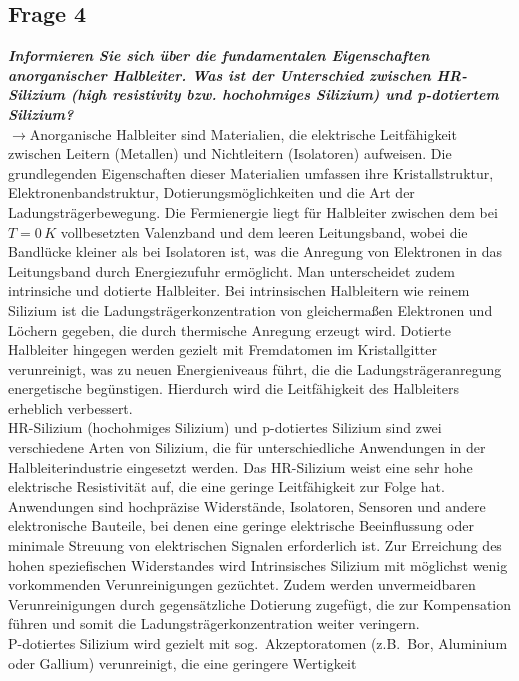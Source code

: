 \subsection{\label{subsec:FZV4}Frage 4}
\textbf{\textit{Informieren Sie sich über die fundamentalen Eigenschaften anorganischer Halbleiter.
Was ist der Unterschied zwischen HR-Silizium (high resistivity bzw. hochohmiges
Silizium) und p-dotiertem Silizium?}}\\
$\rightarrow$Anorganische Halbleiter sind Materialien, die elektrische Leitfähigkeit zwischen Leitern 
(Metallen) und Nichtleitern (Isolatoren) aufweisen. 
Die grundlegenden Eigenschaften dieser Materialien umfassen ihre Kristallstruktur, 
Elektronenbandstruktur, Dotierungsmöglichkeiten und die Art der Ladungsträgerbewegung.
Die Fermienergie liegt für Halbleiter zwischen dem bei $T=0\,\si{K}$ vollbesetzten 
Valenzband und dem leeren Leitungsband, wobei die Bandlücke kleiner als bei Isolatoren ist, 
was die Anregung von Elektronen in das Leitungsband durch Energiezufuhr ermöglicht. 
Man unterscheidet zudem intrinsiche und dotierte Halbleiter. 
Bei intrinsischen Halbleitern wie reinem Silizium ist die Ladungsträgerkonzentration von 
gleichermaßen Elektronen und Löchern gegeben, die durch thermische Anregung erzeugt wird. 
Dotierte Halbleiter hingegen werden gezielt mit Fremdatomen im Kristallgitter verunreinigt, 
was zu neuen Energieniveaus führt, die die Ladungsträgeranregung energetische begünstigen. 
Hierdurch wird die Leitfähigkeit des Halbleiters erheblich verbessert. \\
HR-Silizium (hochohmiges Silizium) und p-dotiertes Silizium sind zwei verschiedene Arten von Silizium, 
die für unterschiedliche Anwendungen in der Halbleiterindustrie eingesetzt werden.
Das HR-Silizium weist eine sehr hohe elektrische Resistivität auf, die eine geringe Leitfähigkeit 
zur Folge hat. Anwendungen sind hochpräzise Widerstände, 
Isolatoren, Sensoren und andere elektronische Bauteile, bei denen eine geringe 
elektrische Beeinflussung oder minimale Streuung von elektrischen Signalen erforderlich ist.
Zur Erreichung des hohen speziefischen Widerstandes wird Intrinsisches Silizium mit 
möglichst wenig vorkommenden Verunreinigungen gezüchtet. Zudem werden unvermeidbaren Verunreinigungen 
durch gegensätzliche Dotierung zugefügt, die zur Kompensation führen und somit die Ladungsträgerkonzentration
weiter veringern. \\
P-dotiertes Silizium wird gezielt mit sog.~Akzeptoratomen (z.B.~Bor, Aluminium oder Gallium)
verunreinigt, die eine geringere Wertigkeit 
